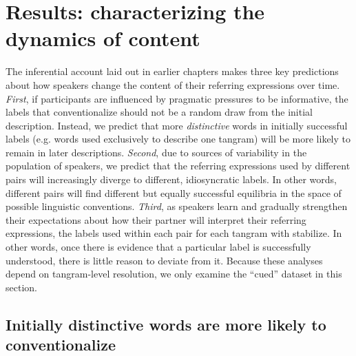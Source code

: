 \documentclass[alpha-refs]{wiley-article}
\begin{document}

\section{Results: characterizing the dynamics of content}

The inferential account laid out in earlier chapters makes three key predictions about how speakers change the content of their referring expressions over time.
\emph{First}, if participants are influenced by pragmatic pressures to be informative, the labels that conventionalize should not be a random draw from the initial description. 
Instead, we predict that more \emph{distinctive} words in initially successful labels (e.g. words used exclusively to describe one tangram) will be more likely to remain in later descriptions.
\emph{Second}, due to sources of variability in the population of speakers, we predict that the referring expressions used by different pairs will increasingly diverge to different, idiosyncratic labels.
In other words, different pairs will find different but equally successful equilibria in the space of possible linguistic conventions.
\emph{Third}, as speakers learn and gradually strengthen their expectations about how their partner will interpret their referring expressions, the labels used within each pair for each tangram with stabilize.
In other words, once there is evidence that a particular label is successfully understood, there is little reason to deviate from it.
Because these analyses depend on tangram-level resolution, we only examine the ``cued'' dataset in this section.

\subsection{Initially distinctive words are more likely to conventionalize}
\label{sec:distinctive}
\end{document}
